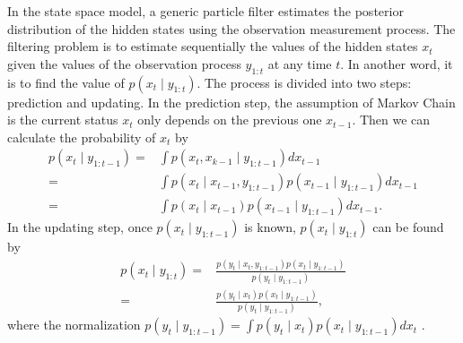 In the state space model, a generic particle filter estimates the posterior distribution of the hidden states using the observation measurement process. The filtering problem is to estimate sequentially the values of the hidden states $x_t$ given the values of the observation process $y_{1:t}$ at any time $t$. In another word, it is to find the value of $p(x_t  \mid  y_{1:t})$. The process is divided into two steps: prediction and updating. In the prediction step, the assumption of Markov Chain is the current status $x_t $ only depends on the previous one $x_{t-1}$. Then we can calculate the probability of $x_t$ by 
\begin{align*}
p(x_t \mid y_{1:t-1})=&\int p(x_t ,x_{k-1}\mid y_{1:t-1}) dx_{t-1}\\
=&\int p(x_t \mid x_{t-1},y_{1:t-1}) p(x_{t-1}\mid y_{1:t-1})dx_{t-1}\\
=&\int p(x_t \mid x_{t-1}) p(x_{t-1}\mid y_{1:t-1})dx_{t-1}.
\end{align*}
In the updating step, once $p(x_t \mid y_{1:t-1})$ is known, $p(x_t \mid y_{1:t})$ can be found by
\begin{align*}
p(x_t \mid y_{1:t})=&\frac{p(y_t \mid x_t ,y_{1:t-1})p(x_{t}\mid y_{1:t-1})}{p(y_t \mid  y_{1:t-1})} \\
=&\frac{p(y_t \mid x_t )p(x_{t}\mid y_{1:t-1})}{p(y_t \mid  y_{1:t-1})},
\end{align*}
where the normalization $p(y_t \mid  y_{1:t-1})=\int p(y_t \mid x_t )p(x_t \mid  y_{1:t-1}) dx_t $ \cite{arulampalam2002tutorial}.

